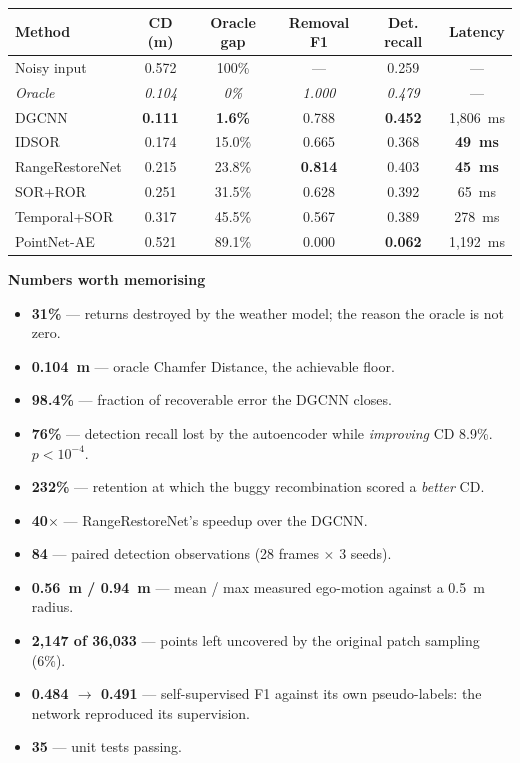 \documentclass[11pt,a4paper]{article}
\begin{document}
\begin{table}[h]
\centering\small
\setlength{\tabcolsep}{4pt}
\begin{tabular}{lccccc}
\toprule
\textbf{Method} & \textbf{CD (m)} & \textbf{Oracle gap} & \textbf{Removal F1} &
\textbf{Det. recall} & \textbf{Latency}\\
\midrule
Noisy input & 0.572 & 100\% & --- & 0.259 & ---\\
\rowcolor{gray!12}\emph{Oracle} & \emph{0.104} & \emph{0\%} & \emph{1.000} & \emph{0.479} & ---\\
DGCNN & \textbf{0.111} & \textbf{1.6\%} & 0.788 & \textbf{0.452} & 1{,}806~ms\\
IDSOR & 0.174 & 15.0\% & 0.665 & 0.368 & \textbf{49~ms}\\
RangeRestoreNet & 0.215 & 23.8\% & \textbf{0.814} & 0.403 & \textbf{45~ms}\\
SOR+ROR & 0.251 & 31.5\% & 0.628 & 0.392 & 65~ms\\
Temporal+SOR & 0.317 & 45.5\% & 0.567 & 0.389 & 278~ms\\
PointNet-AE & 0.521 & 89.1\% & 0.000 & \textbf{0.062} & 1{,}192~ms\\
\bottomrule
\end{tabular}
\end{table}

\textbf{Numbers worth memorising}

\begin{itemize}[leftmargin=1.4em,itemsep=1pt]
\item \textbf{31\%} --- returns destroyed by the weather model; the reason
the oracle is not zero.
\item \textbf{0.104~m} --- oracle Chamfer Distance, the achievable floor.
\item \textbf{98.4\%} --- fraction of recoverable error the DGCNN closes.
\item \textbf{76\%} --- detection recall lost by the autoencoder while
\emph{improving} CD 8.9\%. $p<10^{-4}$.
\item \textbf{232\%} --- retention at which the buggy recombination scored a
\emph{better} CD.
\item \textbf{40$\times$} --- RangeRestoreNet's speedup over the DGCNN.
\item \textbf{84} --- paired detection observations (28 frames $\times$ 3 seeds).
\item \textbf{0.56~m / 0.94~m} --- mean / max measured ego-motion against a
0.5~m radius.
\item \textbf{2{,}147 of 36{,}033} --- points left uncovered by the original
patch sampling (6\%).
\item \textbf{0.484 $\rightarrow$ 0.491} --- self-supervised F1 against its
own pseudo-labels: the network reproduced its supervision.
\item \textbf{35} --- unit tests passing.
\end{itemize}
\end{document}
